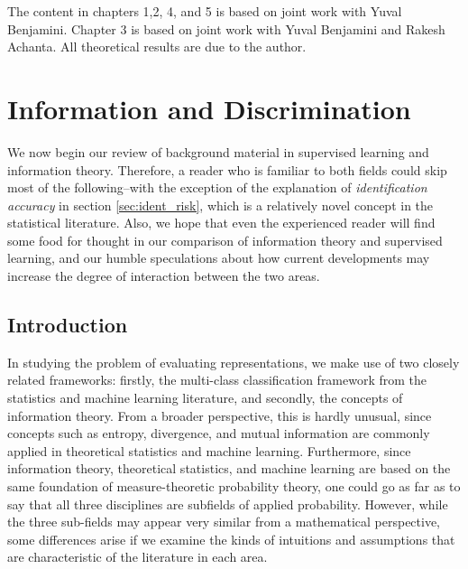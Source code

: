 The content in chapters 1,2, 4, and 5 is based on joint work with
Yuval Benjamini.  Chapter 3 is based on joint work with Yuval
Benjamini and Rakesh Achanta.  All theoretical results are due to the
author.

\section{Information and Discrimination}


We now begin our review of background material in supervised learning
and information theory.  Therefore, a reader who is familiar to both
fields could skip most of the following--with the exception of the
explanation of \emph{identification accuracy} in section
\ref{sec:ident_risk}, which is a relatively novel concept in
the statistical literature.  Also, we hope that even the experienced
reader will find some food for thought in our comparison of
information theory and supervised learning, and our humble
speculations about how current developments may increase the degree of
interaction between the two areas.

\subsection{Introduction}

In studying the problem of evaluating representations, we make use of
two closely related frameworks: firstly, the multi-class
classification framework from the statistics and machine learning
literature, and secondly, the concepts of information theory.  From a
broader perspective, this is hardly unusual, since concepts such as
entropy, divergence, and mutual information are commonly applied in
theoretical statistics and machine learning.  Furthermore, since
information theory, theoretical statistics, and machine learning are
based on the same foundation of measure-theoretic probability theory,
one could go as far as to say that all three disciplines are subfields
of applied probability.  However, while the three sub-fields may
appear very similar from a mathematical perspective, some differences
arise if we examine the kinds of intuitions and assumptions that are
characteristic of the literature in each area.

